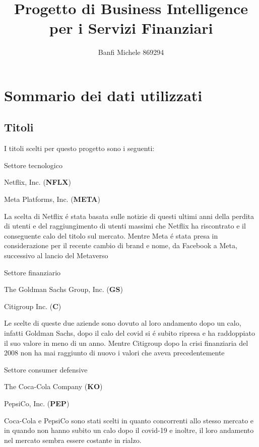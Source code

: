 \documentclass{report}
\title{Progetto di Business Intelligence per i Servizi Finanziari}
\author{Banfi Michele 869294}
\begin{document}
\maketitle

\chapter{Sommario dei dati utilizzati}
\section{Titoli}
I titoli scelti per questo progetto sono i seguenti:

\noindent Settore tecnologico

Netflix, Inc. (\textbf{NFLX})

Meta Platforms, Inc. (\textbf{META})

\noindent La scelta di Netflix é stata basata sulle notizie di questi ultimi anni della perdita di utenti e del raggiungimento di utenti massimi che Netflix ha riscontrato e il conseguente calo del titolo sul mercato. Mentre Meta é stata presa in considerazione per il recente cambio di brand e nome, da Facebook a Meta, successivo al lancio del Metaverso

\noindent Settore finanziario

The Goldman Sachs Group, Inc. (\textbf{GS})

Citigroup Inc. (\textbf{C})

\noindent Le scelte di queste due aziende sono dovuto al loro andamento dopo un calo, infatti Goldman Sachs, dopo il calo del covid si é subito ripresa e ha raddoppiato il suo valore in meno di un anno. Mentre Citigroup dopo la crisi finanziaria del 2008 non ha mai raggiunto di nuovo i valori che aveva precedentemente

\noindent Settore consumer defensive

The Coca-Cola Company (\textbf{KO})

PepsiCo, Inc. (\textbf{PEP})

Coca-Cola e PepsiCo sono stati scelti in quanto concorrenti allo stesso mercato e in quando non hanno subito un calo dopo il covid-19 e inoltre, il loro andamento nel mercato sembra essere costante in rialzo.
\end{document}
